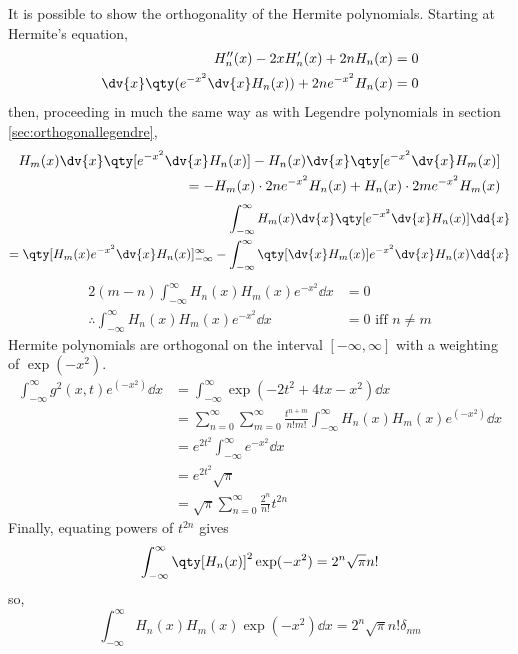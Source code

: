 It is possible to show the orthogonality of the Hermite polynomials.
Starting at Hermite's equation,
\begin{align*}
  H_n^{\prime \prime}(x) - 2x H^\prime_n (x) + 2n H_n (x) &= 0 \\
\dv{x} \qty( e^{-x^2} \dv{x} H_n (x) ) + 2n e^{-x^2} H_n(x) &=0 
\end{align*}
then, proceeding in much the same way as with Legendre polynomials in
section \ref{sec:orthogonallegendre},
\begin{align*}
\begin{split}
  H_m(x) \dv{x} \qty[ e^{-x^2} \dv{x} H_n(x) ] - H_n(x) \dv{x} \qty[ e^{-x^2} \dv{x} H_m(x)] \\= -H_m(x) \cdot 2 n e^{-x^2} H_n(x) + H_n(x) \cdot 2 m e^{-x^2} H_m(x) 
\end{split}
\end{align*}
\begin{align*}
\begin{split}
\int_{-\infty}^{\infty} H_m(x) \dv{x} \qty[ e^{-x^2} \dv{x} H_n(x)] \dd{x} \\= \qty[ H_m(x) e^{-x^2} \dv{x} H_n(x)]_{-\infty}^{\infty} - \int_{-\infty}^{\infty} \qty[ \dv{x} H_m(x)] e^{-x^2} \dv{x} H_n(x) \dd{x}
\end{split}
\end{align*}
\begin{align*}
  2(m-n) \int_{-\infty}^{\infty} H_n(x) H_m(x) e^{-x^2} \dd{x} &= 0 \\
\therefore \int_{-\infty}^{\infty} H_n(x) H_m(x) e^{-x^2} \dd{x} &= 0 \text{ iff } n \neq m
\end{align*}
Hermite polynomials are orthogonal on the interval $[-\infty, \infty]$
with a weighting of $\exp(-x^2)$.
\begin{align*}
  \int_{-\infty}^{\infty} g^2(x,t) e^{(-x^2)} \dd{x} &= \int_{-\infty}^{\infty} \exp(-2t^2+4tx-x^2) \dd{x} \\
&= \sum_{n=0}^{\infty} \sum_{m=0}^{\infty} \frac{t^{n+m}}{n! m!} \int_{-\infty}^{\infty} H_n(x) H_m(x) e^{(-x^2)} \dd{x} \\
&= e^{2t^2}\int_{-\infty}^{\infty} e^{-x^2} \dd{x}\\
&= e^{2t^2} \sqrt{\pi} \\
&= \sqrt{\pi} \sum_{n=0}^{\infty} \frac{2^n}{n!} t^{2n}
\end{align*}
Finally, equating powers of $t^{2n}$ gives
\[ \int_{-\infty}^{\infty} \qty[ H_n(x)]^2 \exp(-x^2) = 2^n \sqrt{\pi} n! \]
so,
\begin{equation}
\label{eq:hermiteorthoweight}
\int_{-\infty}^{\infty} H_n(x) H_m(x) \exp(-x^2) \dd{x} = 2^n \sqrt{\pi} n! \delta_{nm}
\end{equation}
